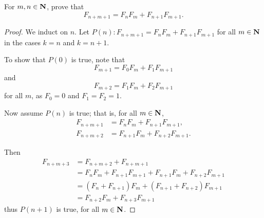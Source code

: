 \begin{prbm}
For $m,n\in\mathbf N$, prove that
\[ F_{n+m+1}=F_nF_m+F_{n+1}F_{m+1}. \]
\end{prbm}

\begin{proof}
We induct on $n$. Let $P(n):F_{n+m+1}=F_nF_m+F_{n+1}F_{m+1}$ for all $m\in\mathbf N$ in the cases $k=n$ and $k=n+1$.

To show that $P(0)$ is true, note that
\[ F_{m+1}=F_0F_m+F_1F_{m+1} \]
and
\[ F_{m+2}=F_1F_m+F_2F_{m+1} \]
for all $m$, as $F_0=0$ and $F_1=F_2=1$.

Now assume $P(n)$ is true; that is, for all $m\in\mathbf N$,
\begin{align*}
F_{n+m+1}&=F_nF_m+F_{n+1}F_{m+1},\\
F_{n+m+2}&=F_{n+1}F_m+F_{n+2}F_{m+1}.
\end{align*}

Then
\begin{align*}
F_{n+m+3}
&=F_{n+m+2}+F_{n+m+1}\\
&=F_n F_m+F_{n+1}F_{m+1}+F_{n+1}F_m+F_{n+2}F_{m+1}\\
&=(F_n+F_{n+1})F_m+(F_{n+1}+F_{n+2})F_{m+1}\\
&=F_{n+2}F_m+F_{n+3}F_{m+1}
\end{align*}
thus $P(n+1)$ is true, for all $m\in\mathbf N$.
\end{proof}